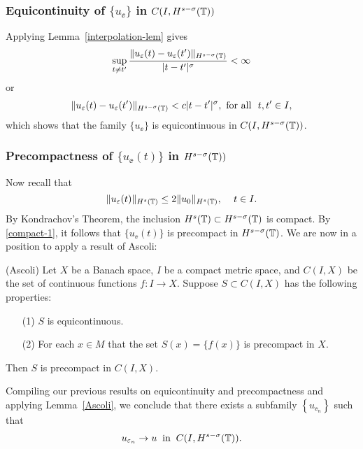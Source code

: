 \subsubsection{Equicontinuity of $\{u_\ee\}$  in
$C(I,H^{s-\sigma}(\mathbb{T}))$} Applying Lemma~\ref{interpolation-lem} gives 
%
\begin{equation}
\label{equic-1}
\sup_{t \neq t'} \frac {\|u_\varepsilon(t) - u_\varepsilon(t') \|_{H^{s -
\sigma}(\mathbb{T})}}{|t - t'|^\sigma} < \infty
\end{equation}
%
or
%
\begin{equation}
\label{equic-2}
\|u_\varepsilon(t) - u_\varepsilon(t') \|_{H^{s - \sigma}(\mathbb{T})}< c|t - t'|^\sigma, 
 \ \text{for all} \  \,\,  t, t'\in I,
\end{equation}
%
which shows that  the family  $\{u_\ee\}$ is equicontinuous in 
$C(I, H^{s-\sigma}(\mathbb{T}))$.
%
%
%
%
%
%
%
%
%
%
%		
\subsubsection{Precompactness of $\{u_\ee(t)\}$ in $H^{s-\sigma}(\mathbb{T}))$}
Now recall that
\begin{equation}
\label{compact-1}
\|u_\varepsilon(t)\|_{H^{s}(\mathbb{T})}
\le
2 \|u_0 \|_{H^s(\mathbb{T})}, \,
\quad
t\in I.
\end{equation}
%
By Kondrachov's Theorem, the inclusion $H^s(\mathbb{T}) \subset H^{s-
\sigma }(\mathbb{T})$ is compact. By \eqref{compact-1},
it follows that $\{u_\ee(t)\}$ is precompact in $H^{s-\sigma}(\mathbb{T})$.
%
%
%
%
We are now in a position to apply a result of Ascoli: 
\begin{lemma}
\label{Ascoli}
(Ascoli)  Let $X$ be a Banach space, $I$ be a compact metric space,
and $C(I,X)$  be the set of continuous functions $f: I\longrightarrow X$.
Suppose $S \subset C(I,X)$  has the following properties:
%
\begin{itemize}
\item[(1)]   $S$ is  equicontinuous.
\item[(2)]  For each $x \in M$ that the set $S(x) = \{f(x)\}$  is  precompact in $X$.
\end{itemize} 
%
Then $S$  is  precompact  in  $C(I,X)$.
\end{lemma}
Compiling our previous results on equicontinuity and precompactness
and applying Lemma~\ref{Ascoli}, we
conclude that there exists a subfamily $\left\{ u_{\ee_n} \right\}$
such that
\begin{equation}
\label{strong-conv-of-u_ep}
u_{\varepsilon_n} \to u \; \; \text{in} \; \; C(I, H^{s-\sigma}(\mathbb{T})).
\end{equation}
%
%
%
%
%
%
%
